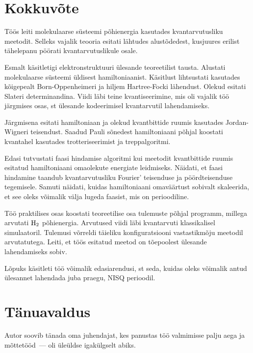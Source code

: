 \documentclass[12pt]{report}
\begin{document}
\chapter{Kokkuvõte}

Töös leiti molekulaarse süsteemi põhienergia kasutades kvantarvutusliku meetodit.
Selleks vajalik teooria esitati lähtudes alustõdedest, kusjuures erilist tähelepanu pöörati kvantarvutuslikule osale.

Esmalt käsitletigi elektronstruktuuri ülesande teoreetilist tausta.
Alustati molekulaarse süsteemi üldisest hamiltoniaanist.
Käsitlust lihtsustati kasutades kõigepealt Born-Oppenheimeri ja hiljem Hartree-Focki lähendust.
Olekud esitati Slateri determinandina.
Viidi läbi teine kvantiseerimine, mis oli vajalik töö järgmises osas, st ülesande kodeerimisel kvantarvutil lahendamiseks.

Järgmisena esitati hamiltoniaan ja olekud kvantbittide ruumis kasutades Jordan-Wigneri teisendust.
Saadud Pauli sõnedest hamiltoniaani põhjal koostati kvantahel kasutades trotteriseerimist ja treppalgoritmi.

Edasi tutvustati faasi hindamise algoritmi kui meetodit kvantbittide ruumis esitatud hamiltoniaani omaolekute energiate leidmiseks.
Näidati, et faasi hindamine taandub kvantarvutusliku Fourier' teisenduse ja pöördteisenduse tegemisele.
Samuti näidati, kuidas hamiltoniaani omaväärtust sobivalt skaleerida, et see oleks võimalik välja lugeda faasist, mis on perioodiline.

Töö praktilises osas koostati teoreetilise osa tulemuste põhjal programm, millega arvutati \(\rm H_2\) põhienergia.
Arvutused viidi läbi kvantarvuti klassikalisel simulaatoril.
Tulemusi võrreldi täieliku konfiguratsiooni vastastikmõju meetodil arvutatutega.
Leiti, et töös esitatud meetod on tõepoolest ülesande lahendamiseks sobiv.

Lõpuks käsitleti töö võimalik edasiarendusi, st seda, kuidas oleks võimalik antud ülesannet lahendada juba praegu, NISQ perioodil.

\chapter*{Tänuavaldus}

Autor soovib tänada oma juhendajat, kes panustas töö valmimisse palju aega ja mõttetööd~--- oli üleüldse igakülgselt abiks.

\printbibliography[heading=bibintoc, title=Kirjandus]
\end{document}

